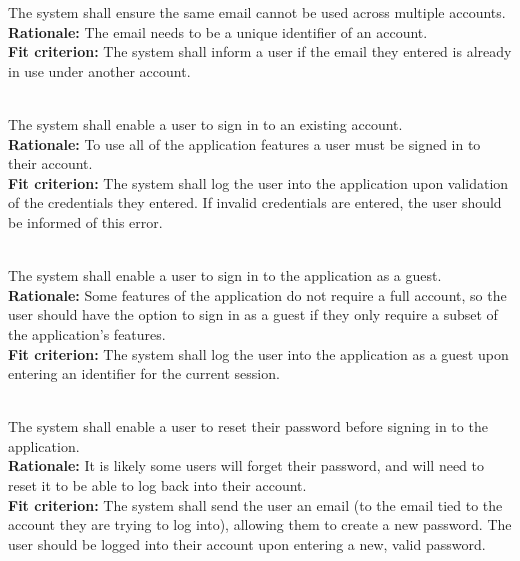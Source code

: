 \documentclass[12pt, titlepage]{article}
\newcounter{FR_Counter}
\begin{document}
The system shall ensure the same email cannot be used across multiple accounts.\\
\textbf{Rationale:}
The email needs to be a unique identifier of an account.\\
\textbf{Fit criterion:}
The system shall inform a user if the email they entered is already in use under another account. \\~\\
\addtocounter{FR_Counter}{1}

The system shall enable a user to sign in to an existing account.\\
\textbf{Rationale:}
To use all of the application features a user must be signed in to their account.\\
\textbf{Fit criterion:}
The system shall log the user into the application upon validation of the credentials they entered. If invalid credentials are entered,
the user should be informed of this error. \\~\\
\addtocounter{FR_Counter}{1}


The system shall enable a user to sign in to the application as a guest.\\
\textbf{Rationale:}
Some features of the application do not require a full account, so the user should have the option to sign in as a guest
if they only require a subset of the application's features.\\
\textbf{Fit criterion:}
The system shall log the user into the application as a guest upon entering an identifier for the current session. \\~\\
\addtocounter{FR_Counter}{1}


The system shall enable a user to reset their password before signing in to the application.\\
\textbf{Rationale:}
It is likely some users will forget their password, and will need to reset it to be able to log back into their account.\\
\textbf{Fit criterion:}
The system shall send the user an email (to the email tied to the account they are trying to log into), allowing them to 
create a new password. The user should be logged into their account upon entering a new, valid password.\\~\\
\addtocounter{FR_Counter}{1}
\end{document}
